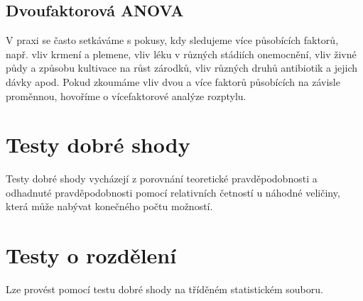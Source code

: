 
\subsection{Dvoufaktorová ANOVA}

V praxi se často setkáváme s pokusy, kdy sledujeme více působících faktorů, např. vliv krmení a plemene, vliv léku v různých stádiích onemocnění, vliv živné půdy a způsobu kultivace na růst zárodků, vliv různých druhů antibiotik a jejich dávky apod. Pokud zkoumáme vliv dvou a více faktorů působících na závisle proměnnou, hovoříme o vícefaktorové analýze rozptylu.


\section{Testy dobré shody}

Testy dobré shody vycházejí z porovnání teoretické pravděpodobnosti a odhadnuté pravděpodobnosti pomocí relativních četností u náhodné veličiny, která může nabývat konečného počtu možností.



\section{Testy o rozdělení}

Lze provést pomocí testu dobré shody na tříděném statistickém souboru.

